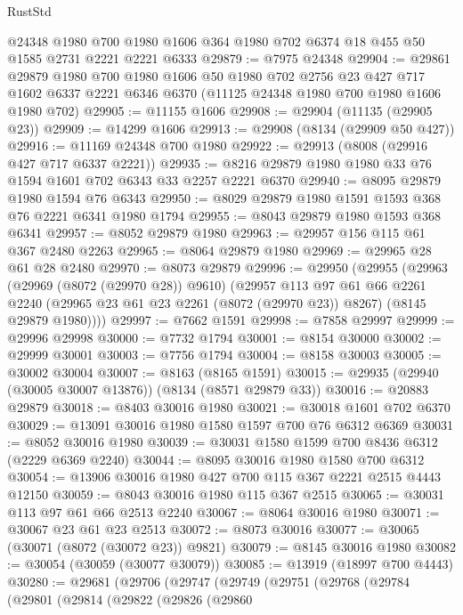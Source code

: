 \begin{lexlean}{RustStd}
\begin{coremodule}
    @24348
    @1980
    @700
    @1980
    @1606
    @364
    @1980
    @702
    @6374
    @18
    @455
    @50
    @1585
    @2731
    @2221
    @2221
    @6333
@29879 := @7975 @24348
@29904 := @29861
    @29879
    @1980
    @700
    @1980
    @1606
    @50
    @1980
    @702
    @2756
    @23
    @427
    @717
    @1602
    @6337
    @2221
    @6346
    @6370
    (@11125 @24348 @1980 @700 @1980 @1606 @1980 @702)
@29905 := @11155 @1606
@29908 := @29904 (@11135 (@29905 @23))
@29909 := @14299 @1606
@29913 := @29908 (@8134 (@29909 @50 @427))
@29916 := @11169 @24348 @700 @1980
@29922 := @29913 (@8008 (@29916 @427 @717 @6337 @2221))
@29935 := @8216 @29879 @1980 @1980 @33 @76 @1594 @1601 @702 @6343 @33 @2257 @2221 @6370
@29940 := @8095 @29879 @1980 @1594 @76 @6343
@29950 := @8029 @29879 @1980 @1591 @1593 @368 @76 @2221 @6341 @1980 @1794
@29955 := @8043 @29879 @1980 @1593 @368 @6341
@29957 := @8052 @29879 @1980
@29963 := @29957 @156 @115 @61 @367 @2480 @2263
@29965 := @8064 @29879 @1980
@29969 := @29965 @28 @61 @28 @2480
@29970 := @8073 @29879
@29996 := @29950
    (@29955
      (@29963
        (@29969 (@8072 (@29970 @28)) @9610)
        (@29957
          @113
          @97
          @61
          @66
          @2261
          @2240
          (@29965 @23 @61 @23 @2261 (@8072 (@29970 @23)) @8267)
          (@8145 @29879 @1980))))
@29997 := @7662 @1591
@29998 := @7858 @29997
@29999 := @29996 @29998
@30000 := @7732 @1794
@30001 := @8154 @30000
@30002 := @29999 @30001
@30003 := @7756 @1794
@30004 := @8158 @30003
@30005 := @30002 @30004
@30007 := @8163 (@8165 @1591)
@30015 := @29935 (@29940 (@30005 @30007 @13876)) (@8134 (@8571 @29879 @33))
@30016 := @20883 @29879
@30018 := @8403 @30016 @1980
@30021 := @30018 @1601 @702 @6370
@30029 := @13091 @30016 @1980 @1580 @1597 @700 @76 @6312 @6369
@30031 := @8052 @30016 @1980
@30039 := @30031 @1580 @1599 @700 @8436 @6312 (@2229 @6369 @2240)
@30044 := @8095 @30016 @1980 @1580 @700 @6312
@30054 := @13906 @30016 @1980 @427 @700 @115 @367 @2221 @2515 @4443 @12150
@30059 := @8043 @30016 @1980 @115 @367 @2515
@30065 := @30031 @113 @97 @61 @66 @2513 @2240
@30067 := @8064 @30016 @1980
@30071 := @30067 @23 @61 @23 @2513
@30072 := @8073 @30016
@30077 := @30065 (@30071 (@8072 (@30072 @23)) @9821)
@30079 := @8145 @30016 @1980
@30082 := @30054 (@30059 (@30077 @30079))
@30085 := @13919 (@18997 @700 @4443)
@30280 := @29681
    (@29706
      (@29747
        (@29749
          (@29751
            (@29768
              (@29784
                (@29801
                  (@29814
                    (@29822
                      (@29826
                        (@29860

\end{coremodule}
\end{lexlean}

